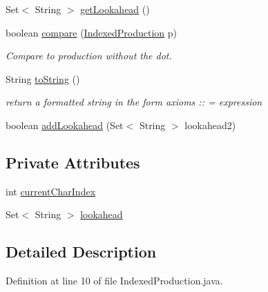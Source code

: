 \begin{DoxyCompactItemize}
\item 
Set$<$ String $>$ \hyperlink{classcontext_free_1_1parser_1_1_indexed_production_a94e0e318a96518ee50607e682e7f0382}{get\-Lookahead} ()
\item 
boolean \hyperlink{classcontext_free_1_1parser_1_1_indexed_production_aa79a2e2cbbc1f35d6416647d80daf3d8}{compare} (\hyperlink{classcontext_free_1_1parser_1_1_indexed_production}{Indexed\-Production} p)
\begin{DoxyCompactList}\small\item\em Compare to production without the dot. \end{DoxyCompactList}\item 
String \hyperlink{classcontext_free_1_1parser_1_1_indexed_production_a061cd84bd37e6111edcd52bcb5b9c749}{to\-String} ()
\begin{DoxyCompactList}\small\item\em return a formatted string in the form axioms \-:\-: = expression \end{DoxyCompactList}\item 
boolean \hyperlink{classcontext_free_1_1parser_1_1_indexed_production_ae6af99251737ae274afc4028fa6eb13e}{add\-Lookahead} (Set$<$ String $>$ lookahead2)
\end{DoxyCompactItemize}
\subsection*{Private Attributes}
\begin{DoxyCompactItemize}
\item 
int \hyperlink{classcontext_free_1_1parser_1_1_indexed_production_a8ed426b66a378ce272cc13ae397e52cd}{current\-Char\-Index}
\item 
Set$<$ String $>$ \hyperlink{classcontext_free_1_1parser_1_1_indexed_production_a58e8935cd1c81a767b47b4d31c87b35c}{lookahead}
\end{DoxyCompactItemize}


\subsection{Detailed Description}


Definition at line 10 of file Indexed\-Production.\-java.



